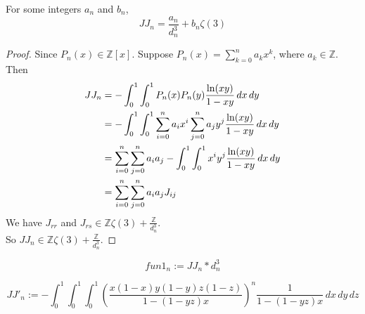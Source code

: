 \begin{lemma}\label{J_n_integers_an_bn}
    For some integers $a_n$ and $b_n$,
    \[ JJ_n = \frac{a_n}{d_n^3} + b_n\zeta(3) \]
\end{lemma}
\begin{proof}
    \leanok
    Since $P_n(x) \in \mathbb{Z}[x]$. Suppose $P_n(x) = \sum\limits_{k=0}^{n}a_kx^k$, where $a_k \in \mathbb{Z}$.\\
    Then 
    \begin{align*}
        JJ_n &= -\int_{0}^{1}\int_{0}^{1} P_n(x)P_n(y)\frac{{\rm ln}(xy)}{1-xy} \, dx \, dy \\
        &= -\int_{0}^{1}\int_{0}^{1} \sum\limits_{i=0}^{n}a_ix^i \sum\limits_{j=0}^{n}a_jy^j \frac{{\rm ln}(xy)}{1-xy} \, dx \, dy\\
        &= \sum\limits_{i=0}^{n}\sum\limits_{j=0}^{n}a_i a_j -\int_{0}^{1}\int_{0}^{1} x^i y^j \frac{{\rm ln}(xy)}{1-xy} \, dx \, dy\\
        &= \sum\limits_{i=0}^{n}\sum\limits_{j=0}^{n}a_i a_j J_{ij}\\
    \end{align*}
    We have $J_{rr}$ and $J_{rs} \in \mathbb{Z}\zeta(3) + \frac{\mathbb{Z}}{d_n^3}$.\\
    So $JJ_n \in \mathbb{Z}\zeta(3) + \frac{\mathbb{Z}}{d_n^3}$.
\end{proof}

\begin{definition}\label{fun1}
    \leanok
    \[ fun1_n := JJ_n * d_n^3 \]
\end{definition}

\begin{definition}\label{JJ'_n}
    \leanok
    \[ JJ'_n := - \int_{0}^{1}\int_{0}^{1}\int_{0}^{1} (\frac{x(1-x)y(1-y)z(1-z)}{1-(1-yz)x})^n \frac{1}{1-(1-yz)x} \, dx \, dy \, dz \]
\end{definition}

